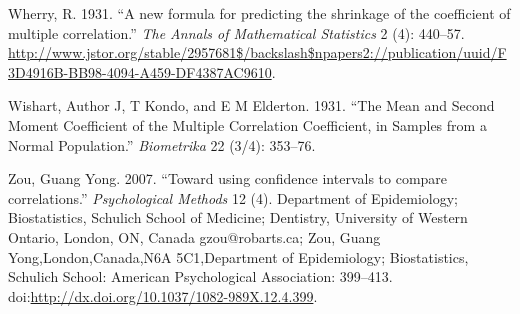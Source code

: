 \documentclass[]{article}
\begin{document}
\hypertarget{ref-Wherry1931}{}
Wherry, R. 1931. ``A new formula for predicting the shrinkage of the
coefficient of multiple correlation.'' \emph{The Annals of Mathematical
Statistics} 2 (4): 440--57.
\url{http://www.jstor.org/stable/2957681$/backslash$npapers2://publication/uuid/F3D4916B-BB98-4094-A459-DF4387AC9610}.

\hypertarget{ref-Wishart1931}{}
Wishart, Author J, T Kondo, and E M Elderton. 1931. ``The Mean and
Second Moment Coefficient of the Multiple Correlation Coefficient, in
Samples from a Normal Population.'' \emph{Biometrika} 22 (3/4): 353--76.

\hypertarget{ref-Zou2007}{}
Zou, Guang Yong. 2007. ``Toward using confidence intervals to compare
correlations.'' \emph{Psychological Methods} 12 (4). Department of
Epidemiology; Biostatistics, Schulich School of Medicine; Dentistry,
University of Western Ontario, London, ON, Canada gzou@robarts.ca; Zou,
Guang Yong,London,Canada,N6A 5C1,Department of Epidemiology;
Biostatistics, Schulich School: American Psychological Association:
399--413.
doi:\href{https://doi.org/http://dx.doi.org/10.1037/1082-989X.12.4.399}{http://dx.doi.org/10.1037/1082-989X.12.4.399}.
\end{document}
